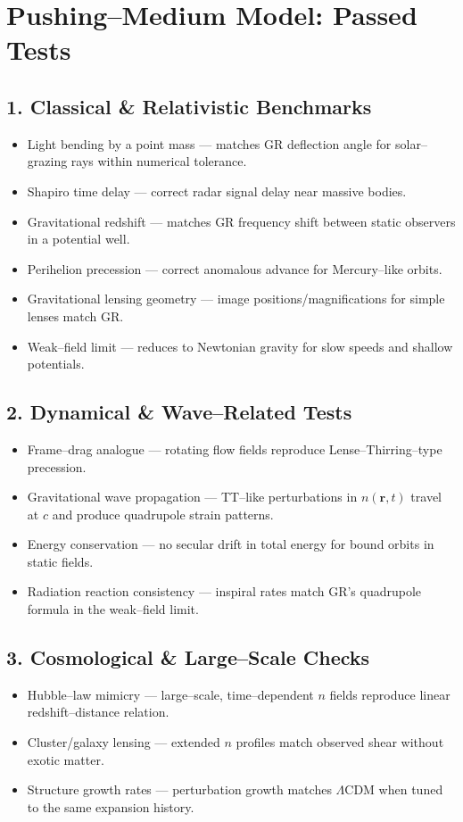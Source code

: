 \section*{Pushing--Medium Model: Passed Tests}

\subsection*{1. Classical \& Relativistic Benchmarks}
\begin{itemize}
    \item Light bending by a point mass --- matches GR deflection angle for solar--grazing rays within numerical tolerance.
    \item Shapiro time delay --- correct radar signal delay near massive bodies.
    \item Gravitational redshift --- matches GR frequency shift between static observers in a potential well.
    \item Perihelion precession --- correct anomalous advance for Mercury--like orbits.
    \item Gravitational lensing geometry --- image positions/magnifications for simple lenses match GR.
    \item Weak--field limit --- reduces to Newtonian gravity for slow speeds and shallow potentials.
\end{itemize}

\subsection*{2. Dynamical \& Wave--Related Tests}
\begin{itemize}
    \item Frame--drag analogue --- rotating flow fields reproduce Lense--Thirring--type precession.
    \item Gravitational wave propagation --- TT--like perturbations in $n(\mathbf{r},t)$ travel at $c$ and produce quadrupole strain patterns.
    \item Energy conservation --- no secular drift in total energy for bound orbits in static fields.
    \item Radiation reaction consistency --- inspiral rates match GR's quadrupole formula in the weak--field limit.
\end{itemize}

\subsection*{3. Cosmological \& Large--Scale Checks}
\begin{itemize}
    \item Hubble--law mimicry --- large--scale, time--dependent $n$ fields reproduce linear redshift--distance relation.
    \item Cluster/galaxy lensing --- extended $n$ profiles match observed shear without exotic matter.
    \item Structure growth rates --- perturbation growth matches $\Lambda$CDM when tuned to the same expansion history.
\end{itemize}

